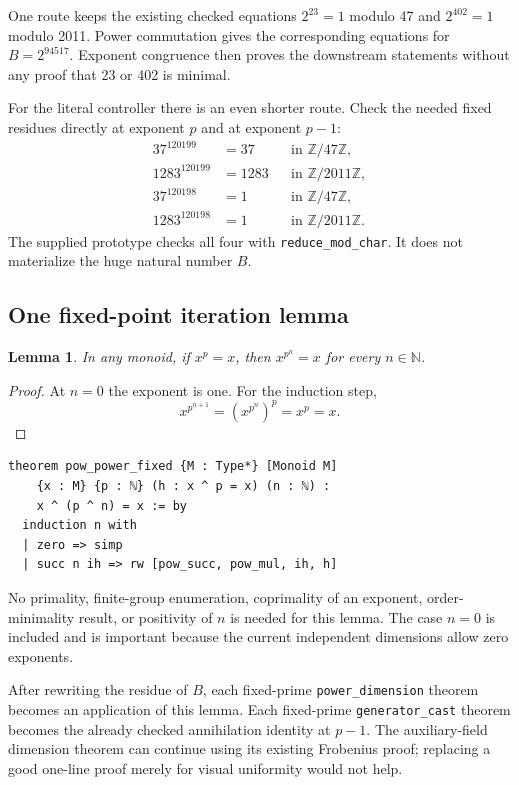 \documentclass[11pt,letterpaper]{article}
\newcommand{\code}[1]{{\small\nolinkurl{#1}}}
\newtheorem{lemma}{Lemma}
\begin{document}
One route keeps the existing checked equations $2^{23}=1$ modulo 47 and $2^{402}=1$ modulo 2011. Power commutation gives the corresponding equations for $B=2^{94517}$. Exponent congruence then proves the downstream statements without any proof that 23 or 402 is minimal.

For the literal controller there is an even shorter route. Check the needed fixed residues directly at exponent $p$ and at exponent $p-1$:
\begin{align*}
37^{120199}&=37 &&\text{in }\mathbb Z/47\mathbb Z,\\
1283^{120199}&=1283 &&\text{in }\mathbb Z/2011\mathbb Z,\\
37^{120198}&=1 &&\text{in }\mathbb Z/47\mathbb Z,\\
1283^{120198}&=1 &&\text{in }\mathbb Z/2011\mathbb Z.
\end{align*}
The supplied prototype checks all four with \code{reduce_mod_char}. It does not materialize the huge natural number $B$.

\subsection{One fixed-point iteration lemma}

\begin{lemma}
In any monoid, if $x^p=x$, then $x^{p^n}=x$ for every $n\in\mathbb N$.
\end{lemma}
\begin{proof}
At $n=0$ the exponent is one. For the induction step,
\[
 x^{p^{n+1}}=(x^{p^n})^p=x^p=x.
\]
\end{proof}

\begin{Verbatim}[fontsize=\small,breaklines=true,samepage=true]
theorem pow_power_fixed {M : Type*} [Monoid M]
    {x : M} {p : ℕ} (h : x ^ p = x) (n : ℕ) :
    x ^ (p ^ n) = x := by
  induction n with
  | zero => simp
  | succ n ih => rw [pow_succ, pow_mul, ih, h]
\end{Verbatim}

No primality, finite-group enumeration, coprimality of an exponent, order-minimality result, or positivity of $n$ is needed for this lemma. The case $n=0$ is included and is important because the current independent dimensions allow zero exponents.

After rewriting the residue of $B$, each fixed-prime \code{power_dimension} theorem becomes an application of this lemma. Each fixed-prime \code{generator_cast} theorem becomes the already checked annihilation identity at $p-1$. The auxiliary-field dimension theorem can continue using its existing Frobenius proof; replacing a good one-line proof merely for visual uniformity would not help.
\end{document}
